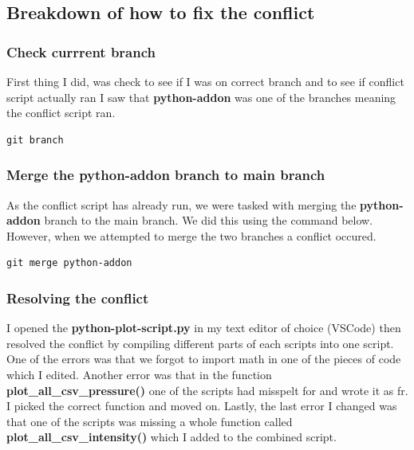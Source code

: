 \documentclass[]{article}
\begin{document}
\subsection{Breakdown of how to fix the conflict}
\subsubsection{Check currrent branch}
First thing I did, was check to see if I was on correct branch and to see if conflict script actually ran
I saw that \textbf{python-addon} was one of the branches meaning the conflict script ran.
\begin{tcolorbox}[colback=white, colframe=black, boxrule=1pt, arc=2mm, 
    fonttitle=\bfseries, listing only, listing options={language=sh, basicstyle=\ttfamily}]
\begin{verbatim}
git branch
\end{verbatim}
\end{tcolorbox}

\subsubsection{Merge the python-addon branch to main branch}
As the conflict script has already run, we were tasked with merging the \textbf{python-addon} branch to the main
branch. We did this using the command below. However, when we attempted to merge the two branches a conflict occured.
\begin{tcolorbox}[colback=white, colframe=black, boxrule=1pt, arc=2mm, 
    fonttitle=\bfseries, listing only, listing options={language=sh, basicstyle=\ttfamily}]
\begin{verbatim}
git merge python-addon
\end{verbatim}
\end{tcolorbox}

\subsubsection{Resolving the conflict}
I opened the \textbf{python-plot-script.py} in my text editor of choice (VSCode) then resolved the conflict by compiling different
parts of each scripts into one script. One of the errors was that we forgot to import math in one of the pieces of code
which I edited. Another error was that in the function \textbf{plot\_all\_csv\_pressure()} one of the scripts had misspelt for and
wrote it as fr. I picked the correct function and moved on. Lastly, the last error I changed was that one of the scripts
was missing a whole function called \textbf{plot\_all\_csv\_intensity()} which I added to the combined script.
\end{document}

